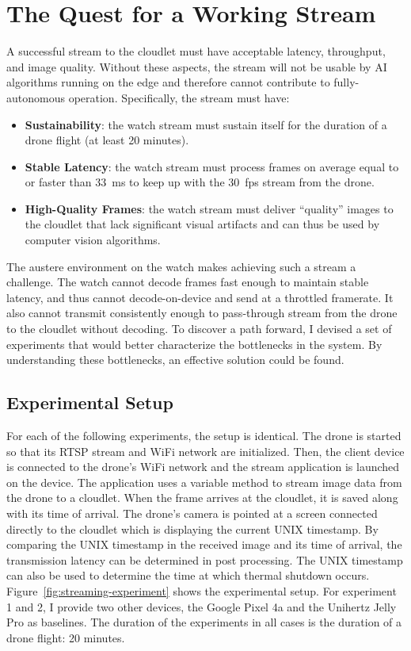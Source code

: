 \section{The Quest for a Working Stream}
\label{sec:quest-working-stream}
A successful stream to the cloudlet must have acceptable latency, throughput, and image quality. Without these aspects, the stream will not be usable by AI algorithms running on the edge and therefore cannot contribute to fully-autonomous operation. Specifically, the stream must have:
\begin{itemize}
    \item \textbf{Sustainability}: the watch stream must sustain itself for the duration of a drone flight (at least 20 minutes).
    \item \textbf{Stable Latency}: the watch stream must process frames on average equal to or faster than 33~ms to keep up with the 30~fps stream from the drone.
    \item \textbf{High-Quality Frames}: the watch stream must deliver ``quality'' images to the cloudlet that lack significant visual artifacts and can thus be used by computer vision algorithms.
\end{itemize}
The austere environment on the watch makes achieving such a stream a challenge. The watch cannot decode frames fast enough to maintain stable latency, and thus cannot decode-on-device and send at a throttled framerate. It also cannot transmit consistently enough to pass-through stream from the drone to the cloudlet without decoding. To discover a path forward, I devised a set of experiments that would better characterize the bottlenecks in the system. By understanding these bottlenecks, an effective solution could be found.

\subsection{Experimental Setup}
For each of the following experiments, the setup is identical. The drone is started so that its RTSP stream and WiFi network are initialized. Then, the client device is connected to the drone’s WiFi network and the stream application is launched on the device. The application uses a variable method to stream image data from the drone to a cloudlet. When the frame arrives at the cloudlet, it is saved along with its time of arrival. The drone’s camera is pointed at a screen connected directly to the cloudlet which is displaying the current UNIX timestamp. By comparing the UNIX timestamp in the received image and its time of arrival, the transmission latency can be determined in post processing. The UNIX timestamp can also be used to determine the time at which thermal shutdown occurs. Figure~\ref{fig:streaming-experiment} shows the experimental setup. For experiment 1 and 2, I provide two other devices, the Google Pixel 4a and the Unihertz Jelly Pro as baselines. The duration of the experiments in all cases is the duration of a drone flight: 20 minutes.

